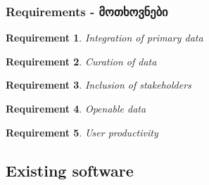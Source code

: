 \documentclass{beamer}
\newtheorem{requirement}{Requirement}
\begin{document}
\begin{frame}

\frametitle{Requirements - მოთხოვნები}
\begin{requirement}
\label{req:primary-data}
Integration of primary data
\end{requirement}


\begin{requirement}
\label{req:curation}
Curation of data
\end{requirement}


\begin{requirement}
\label{req:inclusive}
Inclusion of stakeholders
\end{requirement}

\begin{requirement}
\label{req:openable}
Openable data
\end{requirement}


\begin{requirement}
\label{req:productivity}
User productivity
\end{requirement}

\end{frame}


\subsection{Existing software }
\end{document}
